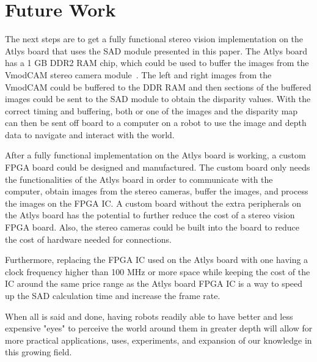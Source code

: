 \chapter{Future Work}

The next steps are to get a fully functional stereo vision implementation on the Atlys board that uses the SAD module presented in this paper. The Atlys board has a 1 GB DDR2 RAM chip, which could be used to buffer the images from the VmodCAM stereo camera module~\cite{atlysBoard}. The left and right images from the VmodCAM could be buffered to the DDR RAM and then sections of the buffered images could be sent to the SAD module to obtain the disparity values. With the correct timing and buffering, both or one of the images and the disparity map can then be sent off board to a computer on a robot to use the image and depth data to navigate and interact with the world.

After a fully functional implementation on the Atlys board is working, a custom FPGA board could be designed and manufactured. The custom board only needs the functionalities of the Atlys board in order to communicate with the computer, obtain images from the stereo cameras, buffer the images, and process the images on the FPGA IC. A custom board without the extra peripherals on the Atlys board has the potential to further reduce the cost of a stereo vision FPGA board. Also, the stereo cameras could be built into the board to reduce the cost of hardware needed for connections.

Furthermore, replacing the FPGA IC used on the Atlys board with one having a clock frequency higher than 100 MHz or more space while keeping the cost of the IC around the same price range as the Atlys board FPGA IC is a way to speed up the SAD calculation time and increase the frame rate.

When all is said and done, having robots readily able to have better and less expensive "eyes" to perceive the world around them in greater depth will allow for more practical applications, uses, experiments, and expansion of our knowledge in this growing field.